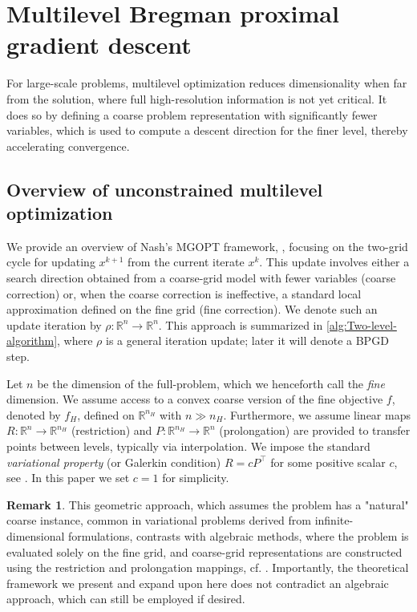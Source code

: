 \documentclass[11pt,reqno]{amsart}
\numberwithin{equation}{section}
\numberwithin{figure}{section}
\theoremstyle{plain}
\theoremstyle{definition}
\newtheorem{remark}[theorem]{Remark}
\newcommand{\R}{\mathbb{R}}
\begin{document}
\section{Multilevel Bregman proximal gradient descent}\label{sec:MLBPGD-big-section}
For large-scale problems, multilevel optimization reduces dimensionality when far from the solution, where full high-resolution information is not yet critical. It does so by defining a coarse problem representation with significantly fewer variables, which is used to compute a descent direction for the finer level, thereby accelerating convergence.
\subsection{Overview of unconstrained multilevel optimization}\label{sec:unconstrained-ML}
We provide an overview of Nash's MGOPT framework, \cite{Nash:2000}, focusing on the two-grid cycle for updating $x^{k+1}$ from the current iterate $x^k$. This update involves either a search direction obtained from a coarse-grid model with fewer variables (coarse correction) or, when the coarse correction is ineffective, a standard local approximation defined on the fine grid (fine correction). We denote such an update iteration by $\rho: \R^n \to \R^n$. This approach is summarized in \cref{alg:Two-level-algorithm}, where $\rho$ is a general iteration update; later it will denote a BPGD step.

Let $n$ be the dimension of the full-problem, which we henceforth call the \emph{fine} dimension. We assume access to a convex coarse version of the fine objective $f$, denoted by $f_H$, defined on $\R^{n_H}$ with $n \gg n_H$.
Furthermore, we assume linear maps $R: \R^{n} \to \R^{n_H}$ (restriction)
and $P: \R^{n_H} \to \R^n$ (prolongation) are provided to transfer points between levels, typically via interpolation. We impose the standard \emph{variational property} (or Galerkin condition) $R = cP^\top$ for some positive scalar $c$, see \cite{SIAM_Multigrid}. In this paper we set $c = 1$ for simplicity. 
\begin{remark}
    This geometric approach, which assumes the problem has a "natural" coarse instance, common in variational problems derived from infinite-dimensional formulations, contrasts with algebraic methods, where the problem is evaluated solely on the fine grid, and coarse-grid representations are constructed using the restriction and prolongation mappings, cf. \cite{ang2023mgprox,Parpas:2017}. Importantly, the theoretical framework we present and expand upon here does not contradict an algebraic approach, which can still be employed if desired.
\end{remark}
\end{document}
